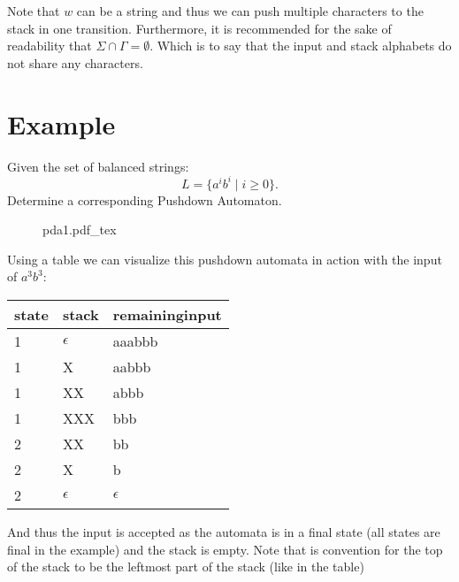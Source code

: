 \documentclass[12pt]{book}
\newcommand{\incfig}[1]{%
    {#1.pdf_tex}
}
\begin{document}
Note that $w$ can be a string and thus we can push multiple characters to the stack in one transition.
Furthermore, it is recommended for the sake of readability that  $\Sigma \cap \Gamma = \emptyset$. 
Which is to say that the input and stack alphabets do not share any characters.
\pagebreak


\section*{Example}
Given the set of balanced strings:
\[
L = \{a^i b^i \mid i\geq 0\}
.\] 
Determine a corresponding Pushdown Automaton.
\begin{figure}[h]
        \centering
        \incfig{pda1}
\end{figure}

Using a table we can visualize this pushdown automata in action with the input of $a^3b^3$:
\begin{table}[h]
\centering
\begin{tabular}{@{}lll@{}}
\toprule
state & stack      & remaining\;input \\ \midrule
1     & $\epsilon$ & aaabbb           \\
1     & X          & aabbb            \\
1     & XX         & abbb             \\
1     & XXX        & bbb              \\
2     & XX         & bb               \\
2     & X          & b                \\
2     & $\epsilon$ & $\epsilon$       \\ \bottomrule
\end{tabular}
\end{table}

And thus the input is accepted as the automata is in a final state (all states are final in the example) and the stack is empty.
Note that is convention for the top of the stack to be the leftmost part of the stack (like in the table)
\end{document}
